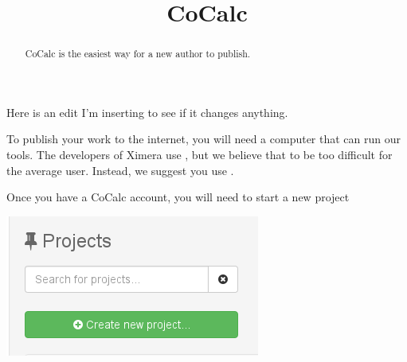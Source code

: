 \documentclass{ximera}
\title{CoCalc}
\begin{document}
\begin{abstract}
CoCalc is the easiest way for a new author to publish.
\end{abstract}
\maketitle
Here is an edit I'm inserting to see if it changes anything.


To publish your work to the internet, you will need a computer that
can run our tools. The developers of Ximera use , but we believe that to be too difficult for the average user. Instead, we suggest you use .

Once you have a CoCalc account, you will need to start a new project

\begin{image}
  \includegraphics{createNewProject.png}
\end{image}
\end{document}
